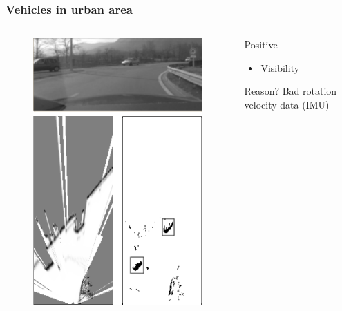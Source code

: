 \documentclass{beamer}
\begin{document}
	\begin{frame}
		\frametitle{Vehicles in urban area}
		
		\begin{columns}[t]
			\begin{column}[t]{5cm}
				\begin{figure}[h]
				\center
				\includegraphics[scale=0.55]{../img/fig:result:scenetwocars}
				\end{figure}
			\end{column}
			\begin{column}[t]{5cm}
				\begin{exampleblock}{Positive}
				\begin{itemize}
				\item Visibility
				\end{itemize}
				\end{exampleblock}
				\begin{block}{Reason?}
				Bad rotation velocity data (IMU)
				\end{block}
			\end{column}
		\end{columns}		

	\end{frame}
\end{document}
